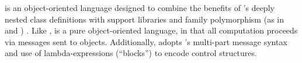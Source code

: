 
\Newspeak{} is an object-oriented language designed to combine the benefits of \Smalltalk{}'s deeply nested class definitions with support libraries and family polymorphism (as in \BETA{} and \gBETA{}) . Like \Smalltalk{}, \Newspeak{} is a pure object-oriented language, in that all computation proceeds via messages sent to objects. Additionally, \Newspeak{} adopts \Smalltalk{}'s multi-part message syntax and use of lambda-expressions (``blocks'') to encode control structures.
